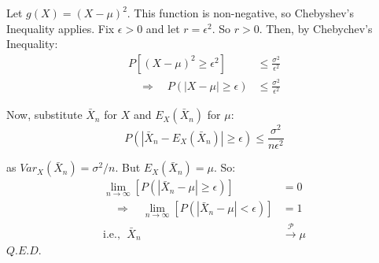 \documentclass[12pt,a4paper]{article}
\newcommand{\imply}{\quad\Rightarrow\quad}
\begin{document}
Let $g(X) = (X-\mu)^2$. This function is non-negative, so Chebyshev's Inequality applies. Fix $\epsilon>0$ and let $r=\epsilon^2$. So $r>0$. Then, by Chebychev's Inequality:
\begin{align*}
P\left[(X-\mu)^2 \geq \epsilon^2\right] &\leq \frac{\sigma^2}{\epsilon^2}\\
\imply P(|X-\mu|\geq \epsilon) &\leq \frac{\sigma^2}{\epsilon^2}
\end{align*}

Now, substitute $\bar{X}_n$ for $X$ and $E_X\left(\bar{X}_n\right)$ for $\mu$:
$$P\left(\left|\bar{X}_n - E_X\left(\bar{X}_n\right)\right|\geq \epsilon\right) \leq \frac{\sigma^2}{n\epsilon^2}$$

as $Var_X\left(\bar{X}_n\right) = \sigma^2/n$. But $E_X\left(\bar{X}_n\right) = \mu$. So:
\begin{align*}
\lim_{n\to\infty}\left[P\left(\left|\bar{X}_n-\mu\right|\geq \epsilon\right)\right] &= 0\\
\imply \lim_{n\to\infty}\left[P\left(\left|\bar{X}_n-\mu\right| < \epsilon\right)\right] &= 1\\
\text{i.e., } \;\bar{X}_n &\xrightarrow{\mathscr{P}} \mu
\end{align*}\hfill$Q.E.D.$
\end{document}
